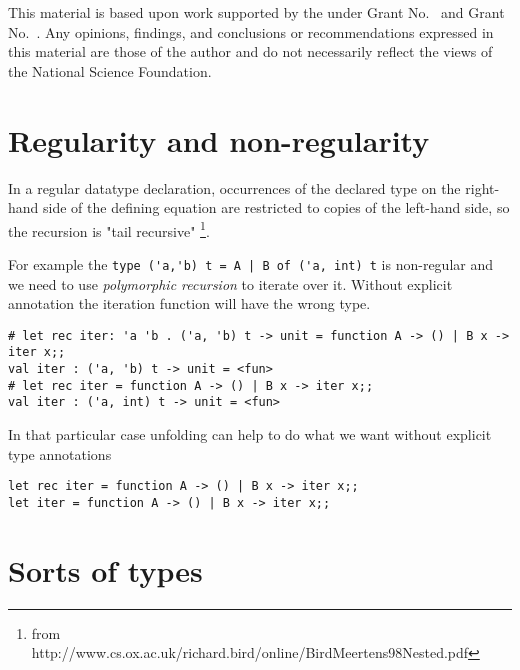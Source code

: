 \documentclass[acmsmall,review,anonymous]{acmart}\settopmatter{printfolios=true,printccs=false,printacmref=false}
\begin{document}
\begin{acks}                            %
  This material is based upon work supported by the
   under Grant
  No.~ and Grant
  No.~.  Any opinions, findings, and
  conclusions or recommendations expressed in this material are those
  of the author and do not necessarily reflect the views of the
  National Science Foundation.
\end{acks}

\section{Regularity and non-regularity}
In a regular datatype declaration, occurrences of the declared type on the right-hand
side  of  the  defining  equation  are  restricted  to  copies  of  the  left-hand  side,  so
the recursion  is "tail recursive"
\footnote{from http://www.cs.ox.ac.uk/richard.bird/online/BirdMeertens98Nested.pdf}.

For example the \lstinline{type ('a,'b) t = A | B of ('a, int) t} is non-regular and we need to use
\textit{polymorphic recursion} to iterate over it. Without explicit annotation the iteration
function will have the wrong type.
\begin{lstlisting}
# let rec iter: 'a 'b . ('a, 'b) t -> unit = function A -> () | B x -> iter x;;
val iter : ('a, 'b) t -> unit = <fun>
# let rec iter = function A -> () | B x -> iter x;;
val iter : ('a, int) t -> unit = <fun>
\end{lstlisting}
In that particular case unfolding can help to do what we want without explicit type annotations
\begin{lstlisting}
let rec iter = function A -> () | B x -> iter x;;
let iter = function A -> () | B x -> iter x;;
\end{lstlisting}

\section{Sorts of types}
% 
\end{document}
